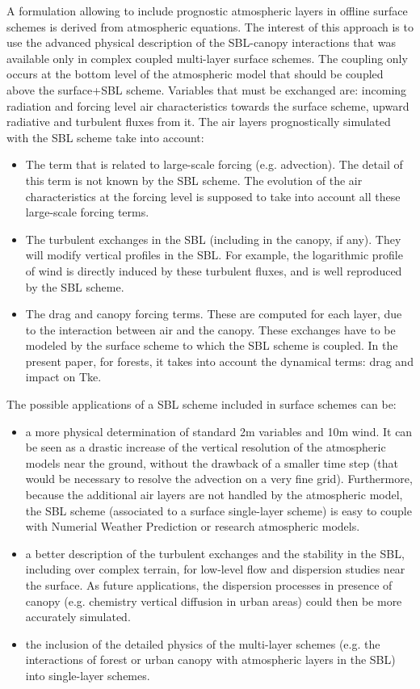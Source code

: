 A formulation allowing to include prognostic atmospheric layers in offline surface schemes is derived from atmospheric equations. The interest of this approach is to use the advanced physical description of the SBL-canopy interactions that was available only in complex coupled multi-layer surface schemes. The coupling only occurs at the bottom level of the atmospheric model that should be coupled above the surface+SBL scheme. Variables that must be exchanged are: incoming radiation and forcing level air characteristics towards the surface scheme, upward radiative and turbulent fluxes from it. The air layers prognostically simulated with the SBL scheme take into account:

\begin{itemize}
\item The term that is related to large-scale forcing (e.g. advection). The detail of this term is not known by the SBL scheme. The evolution of the air characteristics at the forcing level is supposed to take into account all these large-scale forcing terms.
\item The turbulent exchanges in the SBL (including in the canopy, if any). They will modify vertical profiles in the SBL. For example, the logarithmic profile of wind is directly induced by these turbulent fluxes, and is well reproduced by the SBL scheme.
\item The drag and canopy forcing terms. These are computed for each layer, due to the interaction between air and the canopy. These exchanges have to be modeled by the surface scheme to which the SBL scheme is coupled. In the present paper, for forests, it takes into account the dynamical terms: drag and impact on Tke.
\end{itemize}

The possible applications of a SBL scheme included in surface schemes can be:
\begin{itemize}
\item a more physical determination of standard 2m variables and 10m wind. It can be seen as a drastic increase of the vertical resolution of the atmospheric models near the ground, without the drawback of a smaller time step (that would be necessary to resolve the advection on a very fine grid). Furthermore, because the additional air layers are not handled by the atmospheric model, the SBL scheme (associated to a surface single-layer scheme) is easy to couple with Numerial Weather Prediction or research atmospheric models.
\item a better description of the turbulent exchanges and the stability in the SBL, including over complex terrain, for low-level flow and dispersion studies near the surface. As future applications, the dispersion processes in presence of canopy (e.g. chemistry vertical diffusion in urban areas) could then be more accurately simulated.
\item the inclusion of the detailed physics of the multi-layer schemes (e.g. the interactions of forest or urban canopy with atmospheric layers in the SBL) into single-layer schemes. 
\end{itemize}

